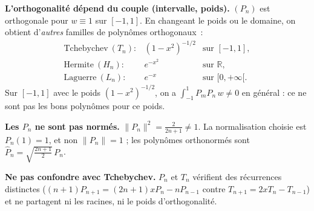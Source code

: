 \begin{mdframed}[style=cexbar]
  \textbf{L'orthogonalité dépend du couple (intervalle, poids).}\enspace
  $(P_n)$ est orthogonale pour $w\equiv 1$ sur $[-1,1]$. En changeant le
  poids ou le domaine, on obtient d'\emph{autres} familles de polynômes
  orthogonaux~:
  \[
    \begin{array}{lll}
      \text{Tchebychev}\ (T_n): & {(1-x^2)}^{-1/2} & \text{sur } [-1,1],\\
      \text{Hermite}\ (H_n):    & e^{-x^2}         & \text{sur } \mathbb{R},\\
      \text{Laguerre}\ (L_n):   & e^{-x}           & \text{sur } [0,+\infty[.
    \end{array}
  \]
  Sur $[-1,1]$ avec le poids ${(1-x^2)}^{-1/2}$, on a $\int_{-1}^1 P_m P_n\,
  w\neq 0$ en général : ce ne sont pas les bons polynômes pour ce poids.

  \smallskip\noindent
  \textbf{Les $P_n$ ne sont pas normés.}\enspace
  $\|P_n\|^2=\frac{2}{2n+1}\neq 1$. La normalisation choisie est
  $P_n(1)=1$, et non $\|P_n\|=1$ ; les polynômes orthonormés sont
  $\widehat{P}_n=\sqrt{\frac{2n+1}{2}}\,P_n$.

  \smallskip\noindent
  \textbf{Ne pas confondre avec Tchebychev.}\enspace
  $P_n$ et $T_n$ vérifient des récurrences distinctes
  ($(n+1)P_{n+1}=(2n+1)xP_n-nP_{n-1}$ contre $T_{n+1}=2xT_n-T_{n-1}$) et
  ne partagent ni les racines, ni le poids d'orthogonalité.
\end{mdframed}

\vspace{6pt}
\exolabel

